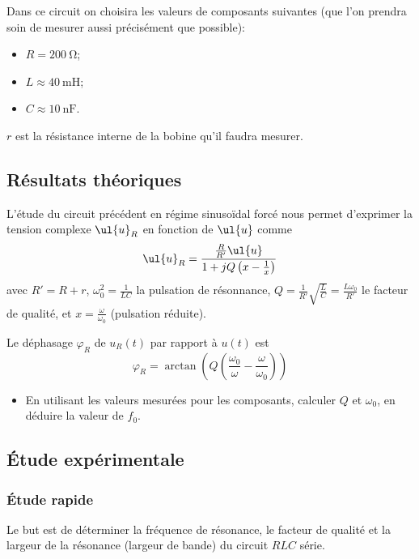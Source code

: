 \documentclass{tp}
\begin{document}
Dans ce circuit on choisira les valeurs de composants suivantes (que l'on prendra soin de mesurer aussi précisément que possible):
\begin{itemize}
  \item $R=\SI{200}{\ohm}$;
  \item $L\approx \SI{40}{\milli\henry}$;
  \item $C \approx \SI{10}{\nano\farad}$. 
\end{itemize}
$r$ est la résistance interne de la bobine qu'il faudra mesurer. 
\subsection{Résultats théoriques}%
\label{sub:resultats_theoriques}

L'étude du circuit précédent en régime sinusoïdal forcé nous permet d'exprimer la tension complexe $\ul{u}_R$ en fonction de $\ul{u}$ comme
\begin{equation}
  \ul{u}_R = \frac{\frac{R}{R'}\ul{u}}{1+jQ\left( x-\frac{1}{x} \right) } 
\end{equation}
avec $R' = R+r$,  $\omega_0^2 = \frac{1}{LC}$ la pulsation de résonnance, $Q=\frac{1}{R'}\sqrt{\frac{L}{C}}=\frac{L\omega_0}{R'}$ le facteur de qualité, et $x=\frac{\omega}{\omega_0}$ (pulsation réduite). 

Le déphasage $\varphi_R$ de $u_R(t)$ par rapport à $u(t)$ est 
\begin{equation}
  \varphi_R = \arctan\left( Q\left( \frac{\omega_0}{\omega} - \frac{\omega}{\omega_0} \right)  \right) 
\end{equation}
\begin{itemize}
  \item En utilisant les valeurs mesurées pour les composants, calculer $Q$ et $\omega_0$, en déduire la valeur de $f_0$.
\end{itemize}

\subsection{Étude expérimentale}%
\label{sub:etude_experimentale}

\subsubsection{Étude rapide}%
\label{ssub:etude_rapide}

Le but est de déterminer la fréquence de résonance, le facteur de qualité et la largeur de la résonance (largeur de bande) du circuit $RLC$ série.
\end{document}
